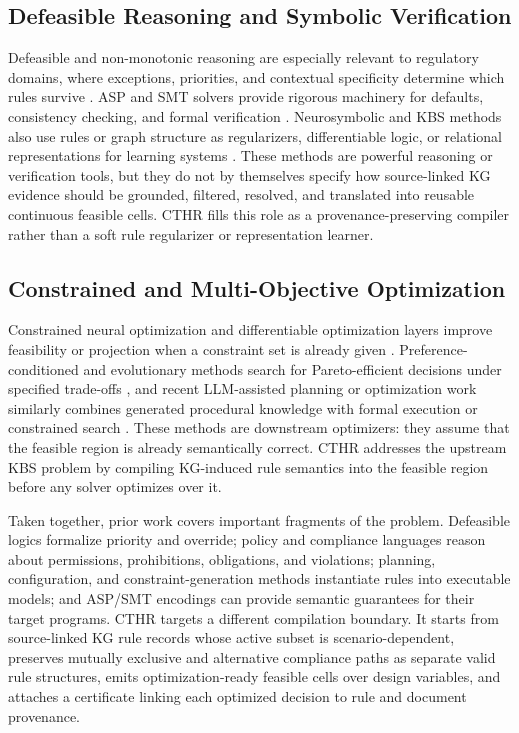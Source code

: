 ﻿\documentclass[a4paper,fleqn]{cas-dc}
\newcommand{\CTHR}{\textsc{CTHR}}
\begin{document}
\subsection{Defeasible Reasoning and Symbolic Verification}
Defeasible and non-monotonic reasoning are especially relevant to regulatory domains, where exceptions, priorities, and contextual specificity determine which rules survive \cite{prakken2004three,bonatti2015defeasible}. ASP and SMT solvers provide rigorous machinery for defaults, consistency checking, and formal verification \cite{brewka2011answer,de2008z3}. Neurosymbolic and KBS methods also use rules or graph structure as regularizers, differentiable logic, or relational representations for learning systems \cite{giunchiglia2022road,yang2020neurasp,marra2025relational,chen2024deduction}. These methods are powerful reasoning or verification tools, but they do not by themselves specify how source-linked KG evidence should be grounded, filtered, resolved, and translated into reusable continuous feasible cells. \CTHR{} fills this role as a provenance-preserving compiler rather than a soft rule regularizer or representation learner.

\subsection{Constrained and Multi-Objective Optimization}
Constrained neural optimization and differentiable optimization layers improve feasibility or projection when a constraint set is already given \cite{donti2021dc3,amos2017optnet,agrawal2019differentiable,tordesillas2023rayen}. Preference-conditioned and evolutionary methods search for Pareto-efficient decisions under specified trade-offs \cite{navon2021learning,mahapatra2020multi,deb2002nsga2,li2019two}, and recent LLM-assisted planning or optimization work similarly combines generated procedural knowledge with formal execution or constrained search \cite{liu2026cart,yang2026lmcoea}. These methods are downstream optimizers: they assume that the feasible region is already semantically correct. \CTHR{} addresses the upstream KBS problem by compiling KG-induced rule semantics into the feasible region before any solver optimizes over it.

Taken together, prior work covers important fragments of the problem. Defeasible logics formalize priority and override; policy and compliance languages reason about permissions, prohibitions, obligations, and violations; planning, configuration, and constraint-generation methods instantiate rules into executable models; and ASP/SMT encodings can provide semantic guarantees for their target programs. \CTHR{} targets a different compilation boundary. It starts from source-linked KG rule records whose active subset is scenario-dependent, preserves mutually exclusive and alternative compliance paths as separate valid rule structures, emits optimization-ready feasible cells over design variables, and attaches a certificate linking each optimized decision to rule and document provenance.
\end{document}
